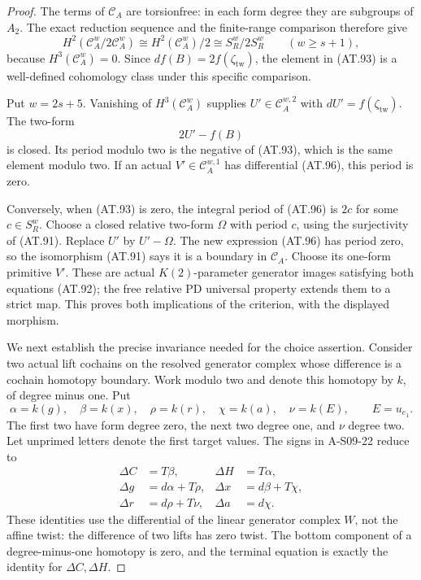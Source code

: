\begin{proof}
The terms of $\mathcal C_A$ are torsionfree: in each form
degree they are subgroups of $A_2$.
The exact reduction sequence and the finite-range comparison
therefore give
\[
 H^2(\mathcal C_A^{w}/2\mathcal C_A^{w})
       \cong H^2(\mathcal C_A^w)/2
       \cong S_R^w/2S_R^w
 \qquad(w\geq s+1),
 \tag{AT.95}
\]
because $H^3(\mathcal C_A^w)=0$.
Since $d f(B)=2f(\zeta_{\mathrm{tw}})$, the element in
(AT.93) is a well-defined cohomology class under this
specific comparison.

Put $w=2s+5$. Vanishing of $H^3(\mathcal C_A^w)$ supplies
$U'\in\mathcal C_A^{w,2}$ with
$dU'=f(\zeta_{\mathrm{tw}})$.
The two-form
\[
                         2U'-f(B)
 \tag{AT.96}
\]
is closed. Its period modulo two is the negative of (AT.93),
which is the same element modulo two. If an actual
$V'\in\mathcal C_A^{w,1}$ has differential (AT.96), this
period is zero.

Conversely, when (AT.93) is zero, the integral period of
(AT.96) is $2c$ for some $c\in S_R^w$.
Choose a closed relative two-form $\Omega$ with period $c$,
using the surjectivity of (AT.91).
Replace $U'$ by $U'-\Omega$. The new expression (AT.96)
has period zero, so the isomorphism (AT.91) says it is a
boundary in $\mathcal C_A$. Choose its one-form primitive
$V'$. These are actual $K(2)$-parameter generator images
satisfying both equations (AT.92); the free relative PD
universal property extends them to a strict map.
This proves both implications of the criterion, with the
displayed morphism.

We next establish the precise invariance needed for the
choice assertion. Consider two actual lift cochains on the
resolved generator complex whose difference is a cochain
homotopy boundary. Work modulo two and denote this homotopy
by $k$, of degree minus one. Put
\[
 \alpha=k(g),\quad \beta=k(x),\quad
 \rho=k(r),\quad \chi=k(a),\quad \nu=k(E),
 \qquad E=u_{e_1}.
\]
The first two have form degree zero, the next two degree
one, and $\nu$ degree two. Let unprimed letters denote the
first target values. The signs in A-S09-22 reduce to
\[
 \begin{aligned}
 \Delta C&=T\beta,& \Delta H&=T\alpha,\\
 \Delta g&=d\alpha+T\rho,&
 \Delta x&=d\beta+T\chi,\\
 \Delta r&=d\rho+T\nu,&
 \Delta a&=d\chi.
 \end{aligned}                                                    \tag{AT.97}
\]
These identities use the differential of the linear generator
complex $W$, not the affine twist: the difference of two
lifts has zero twist. The bottom component of a degree-minus-one
homotopy is zero, and the terminal equation is exactly the
identity for $\Delta C,\Delta H$.


\end{proof}
